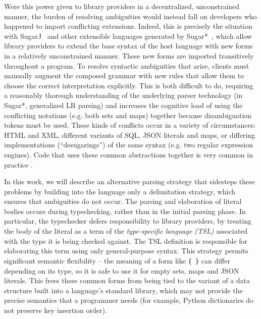 Were this power given to library providers in a decentralized, unconstrained manner, the burden of resolving ambiguities would instead fall on developers who happened to import conflicting extensions. Indeed, this is precisely the situation with SugarJ~\cite{Erdweg:2011:SLL:2048147.2048199} and other extensible languages generated by Sugar*~\cite{Erdweg:2013:FEL:2517208.2517210}, which allow library providers to extend the base syntax of the host language with new forms in a relatively unconstrained manner. These new forms are imported transitively throughout a program. To resolve syntactic ambiguities that arise, clients must manually augment the composed grammar with new rules that allow them to choose the correct interpretation explicitly. This is both difficult to do, requiring a reasonably thorough understanding of the underlying parser technology (in Sugar*, generalized LR parsing) and increases the cognitive load of using the conflicting notations (e.g. both sets and maps) together because disambiguation tokens must be used. These kinds of conflicts occur in a variety of circumstances: HTML and XML, different variants of SQL, JSON literals and maps, or differing implementations (``desugarings'') of the same syntax (e.g. two regular expression engines). Code that uses these common abstractions together is very common in practice \cite{Karakoidas:2014:DLU:2602518.2565878}. 

In this work, we will describe an alternative parsing strategy that sidesteps these problems by building into the language only a delimitation strategy, which ensures that ambiguities do not occur. The parsing and elaboration of literal bodies occurs during typechecking, rather than in the initial parsing phase. In particular, the typechecker defers responsibility to library providers, by treating the body of the literal as a term of the   \emph{type-specific language (TSL)} associated with the type it is being checked against. The TSL definition is responsible for elaborating this term using only general-purpose syntax. This strategy  permits significant semantic flexibility -- the meaning of a form like \verb|{ }| can differ depending  on its type, so it is safe to use it for empty sets, maps and JSON literals. This frees these common forms from being tied to the variant of a  data structure built into a language's standard library, which may not provide the precise semantics that a programmer needs (for example, Python dictionaries do not preserve key insertion order).

